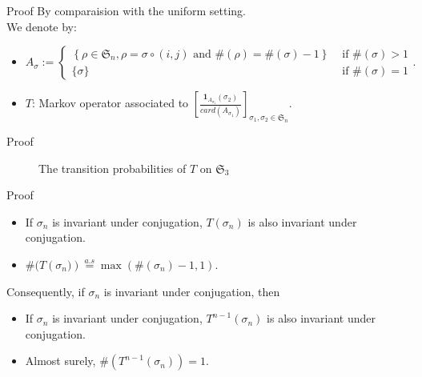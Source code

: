 \documentclass[english,xcolor=table]{beamer}
\begin{document}
\begin{frame}{Proof} 
By comparaision with the uniform setting. 
\\ 
We denote by:
\begin{itemize}
    \item $A_\sigma:=
    \begin{cases}
        \left\{\rho\in\mathfrak{S}_n,\rho =\sigma\circ(i,j)  \text{ and }  \#(\rho)=\#(\sigma)-1 \right\} & \text{ if } \#(\sigma)>1
        \\ \{\sigma\} & \text{ if } \#(\sigma)=1
    \end{cases}.
    $
    \item $T$: Markov operator associated to  $\left[\frac{\mathbf{1}_{A_{\sigma_1}}(\sigma_2)}{card(A_{\sigma_1})}\right]_{\sigma_1,\sigma_2\in \mathfrak{S}_n}$.
\end{itemize}

\end{frame}
\begin{frame}{Proof}
\begin{figure}[H]
\centering
{}
    \caption{The transition probabilities of $T$ on $\mathfrak{S}_3$}
    \label{figm}
\end{figure}
\end{frame}
\begin{frame}{Proof}
    \begin{itemize}
        \item If $\sigma_n$ is invariant under conjugation, $T(\sigma_n)$ is also invariant under conjugation.
        \item $
\#(T \left(\sigma_{n})\right)\overset{a.s}{=}\max(\#(\sigma_n)-1,1). $  
    \end{itemize}
    Consequently, if $\sigma_n$ is invariant under conjugation, then 
    \begin{itemize}
        \item If $\sigma_n$ is invariant under conjugation, $T^{n-1}(\sigma_n)$ is also invariant under conjugation.
        \item Almost surely, $\#\left(T^{n-1}(\sigma_n)\right)=1$.
    \end{itemize}
\end{frame}
\end{document}
